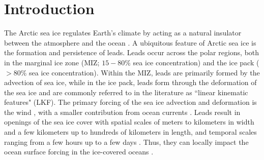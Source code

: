 \documentclass[draft]{agujournal2019}
\begin{document}
%
%
\section{Introduction}

The Arctic sea ice regulates Earth's climate by acting as a natural insulator between the atmosphere and the ocean \cite{Wettlaufer_insulator_1997, Untersteiner_ice_insulator_1961}. A ubiquitous feature of Arctic sea ice is the formation and persistence of leads. Leads occur across the polar regions, both in the marginal ice zone (MIZ; $15-80\%$ sea ice concentration) and the ice pack ($>80\%$ sea ice concentration). Within the MIZ, leads are primarily formed by the advection of sea ice, while in the ice pack, leads form through the deformation of the sea ice and are commonly referred to in the literature as ``linear kinematic features" (LKF). 
The primary forcing of the sea ice advection and deformation is the wind \cite{Linow_lkf_2017, Hutter_scaling_lkf_2018}, with a smaller contribution from ocean currents \cite{Willmes_leads_currents_2023}.
Leads result in openings of the sea ice cover \cite{Rampal_nextsim_2016, Hutchings_model_lkf_2005, Richter_pack_stress_2002} with spatial scales of meters to kilometers in width and a few kilometers up to hundreds of kilometers in length, and temporal scales ranging from a few hours up to a few days \cite{Linow_lkf_2017, Wernecke_Lead_2015, Tschudi_obs_leads_1998}. Thus, they can locally impact the ocean surface forcing in the ice-covered oceans \cite{Lupkes_leads_2008}.
\end{document}
